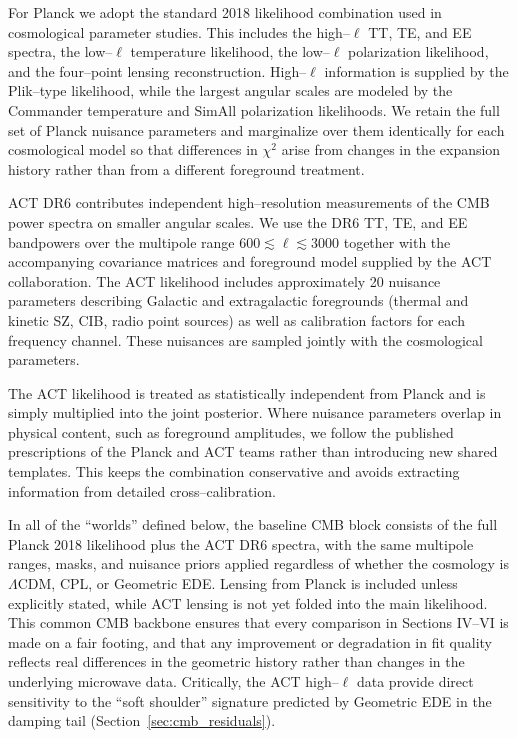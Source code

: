 \documentclass[a4paper,11pt]{article}
\begin{document}
For Planck we adopt the standard 2018 likelihood combination used in cosmological parameter studies. This includes the high--$\ell$ TT, TE, and EE spectra, the low--$\ell$ temperature likelihood, the low--$\ell$ polarization likelihood, and the four--point lensing reconstruction. High--$\ell$ information is supplied by the Plik--type likelihood, while the largest angular scales are modeled by the Commander temperature and SimAll polarization likelihoods. We retain the full set of Planck nuisance parameters and marginalize over them identically for each cosmological model so that differences in $\chi^2$ arise from changes in the expansion history rather than from a different foreground treatment.

ACT DR6 contributes independent high--resolution measurements of the CMB power spectra on smaller angular scales. We use the DR6 TT, TE, and EE bandpowers over the multipole range $600 \lesssim \ell \lesssim 3000$ together with the accompanying covariance matrices and foreground model supplied by the ACT collaboration. The ACT likelihood includes approximately 20 nuisance parameters describing Galactic and extragalactic foregrounds (thermal and kinetic SZ, CIB, radio point sources) as well as calibration factors for each frequency channel. These nuisances are sampled jointly with the cosmological parameters.

The ACT likelihood is treated as statistically independent from Planck and is simply multiplied into the joint posterior. Where nuisance parameters overlap in physical content, such as foreground amplitudes, we follow the published prescriptions of the Planck and ACT teams rather than introducing new shared templates. This keeps the combination conservative and avoids extracting information from detailed cross--calibration.

In all of the ``worlds'' defined below, the baseline CMB block consists of the full Planck 2018 likelihood plus the ACT DR6 spectra, with the same multipole ranges, masks, and nuisance priors applied regardless of whether the cosmology is $\Lambda$CDM, CPL, or Geometric EDE. Lensing from Planck is included unless explicitly stated, while ACT lensing is not yet folded into the main likelihood. This common CMB backbone ensures that every comparison in Sections IV--VI is made on a fair footing, and that any improvement or degradation in fit quality reflects real differences in the geometric history rather than changes in the underlying microwave data. Critically, the ACT high--$\ell$ data provide direct sensitivity to the ``soft shoulder'' signature predicted by Geometric EDE in the damping tail (Section~\ref{sec:cmb_residuals}).
\end{document}

